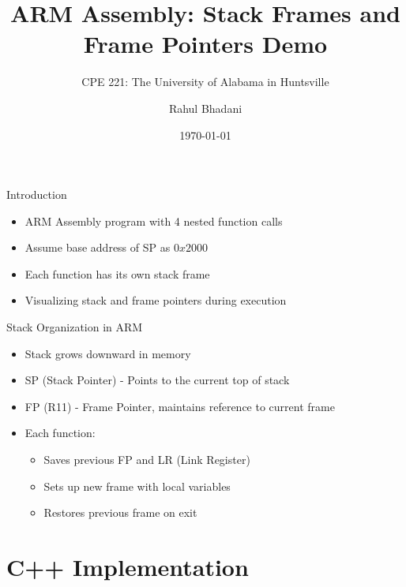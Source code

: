 \documentclass[aspectratio=169]{beamer}
\title{ARM Assembly: Stack Frames and Frame Pointers Demo}
\subtitle{CPE 221: The University of Alabama in Huntsville}
\author{Rahul Bhadani}
\date{\today}
\begin{document}
\begin{frame}

    \titlepage

\end{frame}

\begin{frame}{}
    \tableofcontents
\end{frame}

\begin{frame}{Introduction}
    \begin{itemize}
    \item ARM Assembly program with 4 nested function calls
    \item Assume base address of SP as $0x2000$
    \item Each function has its own stack frame
    \item Visualizing stack and frame pointers during execution
    \end{itemize}
    
\end{frame}

    \begin{frame}{Stack Organization in ARM}
    \begin{itemize}
    \item Stack grows downward in memory
    \item SP (Stack Pointer) - Points to the current top of stack
    \item FP (R11) - Frame Pointer, maintains reference to current frame
    \item Each function:
        \begin{itemize}
        \item Saves previous FP and LR (Link Register)
        \item Sets up new frame with local variables
        \item Restores previous frame on exit
        \end{itemize}
    \end{itemize}
    \end{frame}

        

\section{C++ Implementation}
\end{document}
